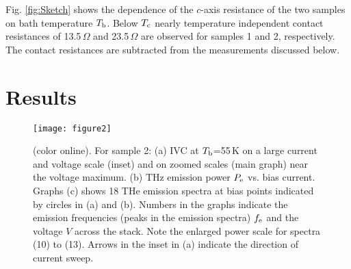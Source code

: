 \documentclass[aps,twocolumn,prb,showpacs,preprintnumbers,superscriptaddress,amsmath,amssymb,longbibliography]{revtex4-1}
\begin{document}
Fig. \ref{fig:Sketch} shows the dependence of the $c$-axis resistance of the two samples on bath temperature $T_{\rm b}$. 
Below $T_{\rm c}$ nearly temperature independent contact resistances of 13.5\,$\Omega$ and 23.5\,$\Omega$ are observed for samples 1 and 2, respectively. The contact resistances are subtracted from the measurements discussed below.

\section{Results}
\label{sec:results}

\begin{figure*}[tb]
\texttt{[image: figure2]}
\caption{(color online). For sample 2: (a) IVC at $T_{\rm b}$=55\,K on a large current and voltage scale (inset) and on zoomed scales (main graph) near the voltage maximum. (b) THz emission power $P_{\rm e}$ vs. bias current. Graphs (c) shows 18 THe emission spectra  at bias points indicated by circles in (a) and (b). Numbers in the graphs indicate the emission frequencies (peaks in the emission spectra) $f_{\rm e}$ and the voltage $V$ across the stack. Note the enlarged power scale for spectra (10) to (13). Arrows in the inset in (a) indicate the direction of current sweep.
}
\label{fig:IVC_new}
\end{figure*}
\end{document}
